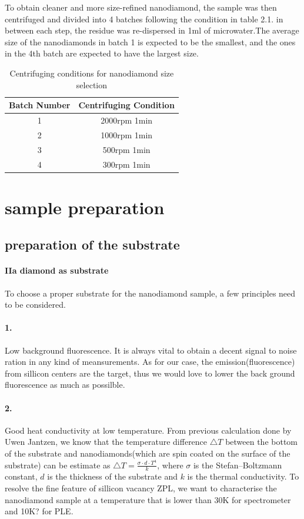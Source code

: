 To obtain cleaner and more size-refined nanodiamond, the sample was then centrifuged and divided into 4 batches following the condition in table 2.1. in between each step, the residue was re-dispersed in 1ml of microwater.The average size of the nanodiamonds in batch 1 is expected to be the smallest, and the ones in the 4th batch are expected to have the largest size.
\begin {table}[]
\caption {Centrifuging conditions for nanodiamond size selection} \label{tab:title} 
\begin{center}
\begin{tabular}{|c|c|}	
	\hline 
	Batch Number & Centrifuging Condition \\ 
	\hline 
	1 & 2000rpm 1min \\ 
	\hline 
	2 & 1000rpm 1min \\ 
	\hline 
	3 & 500rpm 1min \\ 
	\hline 
	4 & 300rpm 1min \\ 
	\hline 
\end{tabular} 
\end{center}
\end{table}
\section[sample preparation]{sample preparation}
\subsection{preparation of the substrate}
\paragraph{IIa diamond as substrate}

To choose a proper substrate for the nanodiamond sample, a few principles need to be considered.

\paragraph{1.}Low background fluorescence. 
It is always vital to obtain a decent signal to noise ration in any kind of meansurements. As for our case, the emission(fluorescence) from sillicon centers are the target, thus we would love to lower the back ground fluorescence as much as possilble.
\paragraph{2.}Good heat conductivity at low temperature.
From previous calculation done by Uwen Jantzen, we know that the temperature difference $\bigtriangleup T$ between the bottom of the substrate and nanodiamonds(which are spin coated on the surface of the substrate) can be estimate as\newline
$\bigtriangleup T = \frac{\sigma \cdot d \cdot T^{4}}{k} $,
where $\sigma$ is the Stefan–Boltzmann constant, $d$ is the thickness of the substrate and $k$ is the thermal conductivity.
To resolve the fine feature of sillicon vacancy ZPL, we want to characterise the nanodiamond sample at a temperature that is lower than 30K for spectrometer and 10K? for PLE.
